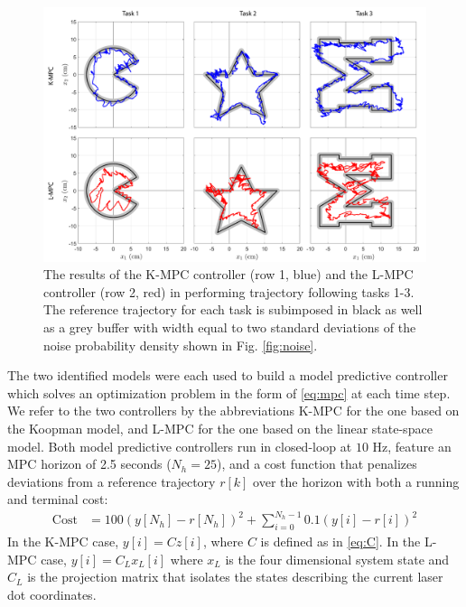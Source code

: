 \begin{figure}
    \centering
    \includegraphics[width=\linewidth]{figures/results_edited_wblue.pdf}
    \caption{The results of the K-MPC controller (row 1, blue) and the L-MPC controller (row 2, red) in performing trajectory following tasks 1-3. The reference trajectory for each task is subimposed in black as well as a grey buffer with width equal to two standard deviations of the noise probability density shown in Fig. \ref{fig:noise}.}
    \label{fig:results}
\end{figure}


The two identified models were each used to build a model predictive controller which solves an optimization problem in the form of \eqref{eq:mpc} at each time step.
We refer to the two controllers by the abbreviations K-MPC for the one based on the Koopman model, and L-MPC for the one based on the linear state-space model. 
Both model predictive controllers run in closed-loop at $10$ Hz, feature an MPC horizon of 2.5 seconds ($N_h = 25$), and a cost function that penalizes deviations from a reference trajectory $r[k]$ over the horizon with both a running and terminal cost:
\begin{align}
    \text{Cost} &= 100 \left( y[N_h] - r[N_h] \right)^2 + \sum_{i=0}^{N_h - 1} 0.1 \left( y[i] - r[i] \right)^2
\end{align}
In the K-MPC case, $y[i] = C z[i]$, where $C$ is defined as in \eqref{eq:C}.
In the L-MPC case, $y[i] = C_L x_L[i]$ where $x_L$ is the four dimensional system state and $C_L$ is the projection matrix that isolates the states describing the current laser dot coordinates. 

